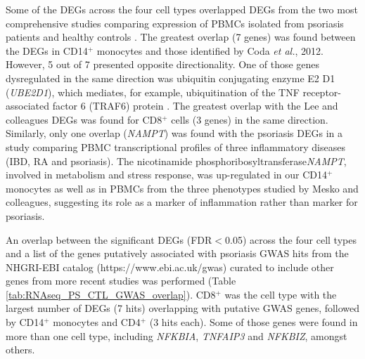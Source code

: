Some of the DEGs across the four cell types overlapped DEGs from the two most comprehensive studies comparing expression of PBMCs isolated from psoriasis patients and healthy controls \parencite{Lee2009,Coda2012}. The greatest overlap (7 genes) was found between the DEGs in CD14$^+$ monocytes and those identified by Coda \textit{et al.}, 2012. However, 5 out of 7 presented opposite directionality. One of those genes dysregulated in the same direction was ubiquitin conjugating enzyme E2 D1 (\textit{UBE2D1}), which mediates, for example, ubiquitination of the TNF receptor-associated factor 6 (TRAF6) protein \parencite{Gru2008}. The greatest overlap with the Lee and colleagues DEGs was found for CD8$^+$ cells (3 genes) in the same direction. Similarly, only one overlap (\textit{NAMPT}) was found with the psoriasis DEGs in a study comparing PBMC transcriptional profiles of three inflammatory diseases (IBD, RA and psoriasis)\parencite{Mesko2010}. The nicotinamide phosphoribosyltransferase\textit{NAMPT}, involved in metabolism and stress response, was up-regulated in our CD14$^+$ monocytes as well as in PBMCs from the three phenotypes studied by Mesko and colleagues, suggesting its role as a marker of inflammation rather than marker for psoriasis.

An overlap between the significant DEGs (FDR$<$0.05) across the four cell types and a list of the genes putatively associated with psoriasis GWAS hits from the NHGRI-EBI catalog (https://www.ebi.ac.uk/gwas) curated to include other genes from more recent studies was performed (Table \ref{tab:RNAseq_PS_CTL_GWAS_overlap}). CD8$^+$ was the cell type with the largest number of DEGs (7 hits) overlapping with putative GWAS genes, followed by CD14$^+$ monocytes and CD4$^+$ (3 hits each). Some of those genes were found in more than one cell type, including \textit{NFKBIA}, \textit{TNFAIP3} and \textit{NFKBIZ}, amongst others.  



